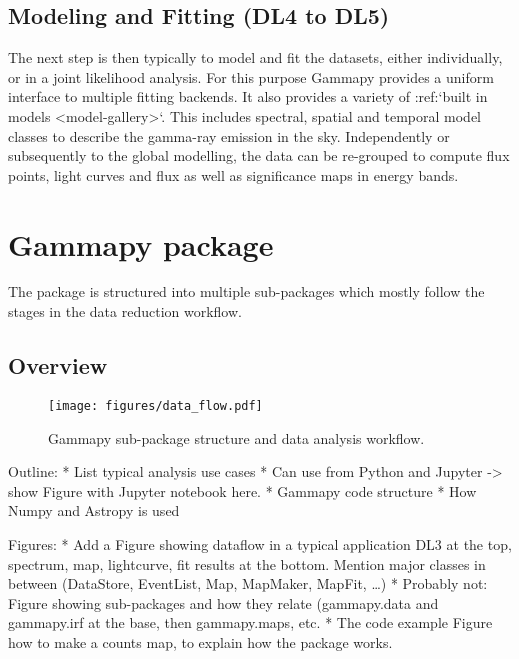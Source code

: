 \subsection{Modeling and Fitting (DL4 to DL5)}

The next step is then typically to model and fit the datasets, either
individually, or in a joint likelihood analysis. For this purpose Gammapy
provides a uniform interface to multiple fitting backends. It also provides
a variety of :ref:`built in models <model-gallery>`. This includes spectral,
spatial and temporal model classes to describe the gamma-ray emission in the sky.
Independently or subsequently to the global modelling, the data can be
re-grouped to compute flux points, light curves and flux as well as significance
maps in energy bands.

\section{Gammapy package}
\label{sec:gammapy-package}

The \gammapy package is structured into multiple sub-packages which mostly
follow the stages in the data reduction workflow.

\subsection{Overview}
\label{ssec:overview}
\begin{figure*}[t]
	\centering
	\texttt{[image: figures/data\_flow.pdf]}
	\caption{
		Gammapy sub-package structure and data analysis workflow. }
	\label{fig:data_flow} \end{figure*}

Outline: * List typical analysis use cases * Can use from Python and Jupyter ->
show Figure with Jupyter notebook here. * Gammapy code structure * How Numpy
and Astropy is used

Figures: * Add a Figure showing dataflow in a typical application DL3 at the
top, spectrum, map, lightcurve, fit results at the bottom. Mention major
classes in between (DataStore, EventList, Map, MapMaker, MapFit, …) * Probably
not: Figure showing sub-packages and how they relate (gammapy.data and
gammapy.irf at the base, then gammapy.maps, etc. * The code example Figure how
to make a counts map, to explain how the package works.














